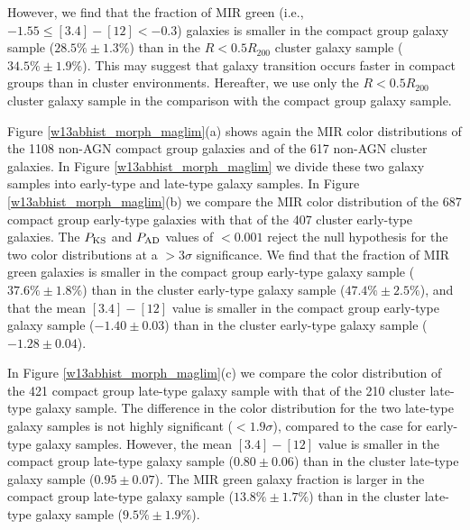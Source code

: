 \documentclass[12pt,preprint,apj]{emulateapj}
\newcommand{\rvir}{R_{200}}
\begin{document}
However, we find that the fraction of MIR green (i.e., $-1.55\leq[3.4]-[12]<-0.3$) 
galaxies is smaller in the compact group galaxy sample ($28.5\%\pm1.3\%$) than 
in the $R<0.5\rvir$ cluster galaxy sample ($34.5\%\pm1.9\%$). 
This may suggest that galaxy transition occurs faster in compact groups than 
in cluster environments. 
Hereafter, we use only the $R<0.5\rvir$ cluster galaxy sample in the comparison 
with the compact group galaxy sample.


Figure \ref{w13abhist_morph_maglim}(a) shows again the MIR color distributions
of the 1108 non-AGN compact group galaxies and of the 617 non-AGN cluster galaxies. 
In Figure \ref{w13abhist_morph_maglim} we divide these two galaxy samples 
into early-type and late-type galaxy samples.
In Figure \ref{w13abhist_morph_maglim}(b) we compare 
the MIR color distribution of the 687 compact group early-type 
galaxies with that of the 407 cluster early-type galaxies.
The $P_{\rm KS}$ and $P_{\rm AD}$ values of 
$<0.001$ reject the null hypothesis for the two color distributions 
at a $>3\sigma$ significance. 
We find that the fraction of MIR green galaxies is smaller in the compact group
early-type galaxy sample ($37.6\%\pm1.8\%$) than in the cluster early-type galaxy 
sample ($47.4\%\pm2.5\%$), and that the mean $[3.4]-[12]$ value is smaller 
in the compact group early-type galaxy sample ($-1.40\pm0.03$) than in 
the cluster early-type galaxy sample ($-1.28\pm0.04$).

In Figure \ref{w13abhist_morph_maglim}(c) we compare the color distribution of 
the 421 compact group late-type galaxy sample with that of the 210 cluster late-type galaxy 
sample. The difference in the color distribution for the two late-type galaxy samples 
is not highly significant ($<1.9\sigma$), compared to the case for early-type galaxy samples. However, the mean $[3.4]-[12]$ value is smaller in the compact group
late-type galaxy sample ($0.80\pm0.06$) than in the cluster late-type galaxy sample
($0.95\pm0.07$). The MIR green galaxy fraction is larger in the compact group
late-type galaxy sample ($13.8\%\pm1.7\%$) than in the cluster late-type galaxy 
sample ($9.5\%\pm1.9\%$).
\end{document}
